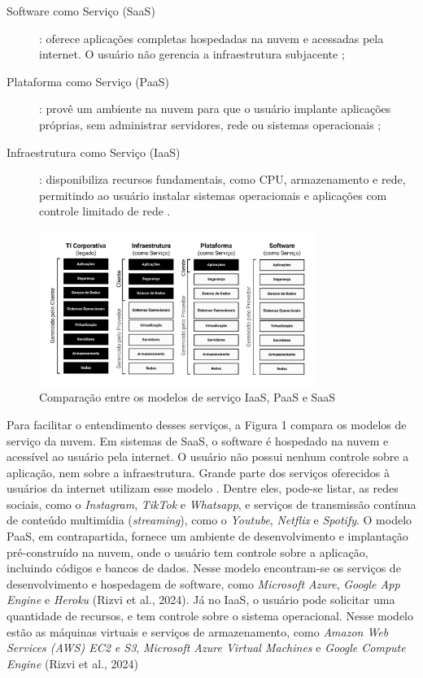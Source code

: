 \begin{description}
    \item[Software como Serviço (SaaS)]: oferece aplicações completas hospedadas na nuvem e acessadas pela internet. O usuário não gerencia a infraestrutura subjacente \cite{mell2011};
    \item[Plataforma como Serviço (PaaS)]: provê um ambiente na nuvem para que o usuário implante aplicações próprias, sem administrar servidores, rede ou sistemas operacionais \cite{mell2011};
    \item[Infraestrutura como Serviço (IaaS)]: disponibiliza recursos fundamentais, como CPU, armazenamento e rede, permitindo ao usuário instalar sistemas operacionais e aplicações com controle limitado de rede \cite{mell2011}.
\end{description}

\begin{figure}[htb]
\centering
\includegraphics[width=0.8\textwidth]{figuras/Figura 1 - Comparação entre os modelos de serviço.png}
\caption{Comparação entre os modelos de serviço IaaS, PaaS e SaaS}
\label{fig:modelos-servico}
\end{figure}

Para facilitar o entendimento desses serviços, a Figura 1 compara os modelos de serviço da nuvem. Em sistemas de SaaS, o software é hospedado na nuvem e acessível ao usuário pela internet. O usuário não possui nenhum controle sobre a aplicação, nem sobre a infraestrutura. Grande parte dos serviços oferecidos à usuários da internet utilizam esse modelo \cite{rizvi2024}. Dentre eles, pode-se listar, as redes sociais, como o \textit{Instagram}, \textit{TikTok} e \textit{Whatsapp}, e serviços de transmissão contínua de conteúdo multimídia (\textit{streaming}), como o \textit{Youtube}, \textit{Netflix} e \textit{Spotify}. O modelo PaaS, em contrapartida, fornece um ambiente de desenvolvimento e implantação pré-construído na nuvem, onde o usuário tem controle sobre a aplicação, incluindo códigos e bancos de dados. Nesse modelo encontram-se os serviços de desenvolvimento e hospedagem de software, como \textit{Microsoft Azure}, \textit{Google App Engine} e \textit{Heroku} (Rizvi et al., 2024). Já no IaaS, o usuário pode solicitar uma quantidade de recursos, e tem controle sobre o sistema operacional. Nesse modelo estão as máquinas virtuais e serviços de armazenamento, como  \textit{Amazon Web Services (AWS) EC2 e S3},  \textit{Microsoft Azure Virtual Machines} e  \textit{Google Compute Engine}  (Rizvi et al., 2024)

